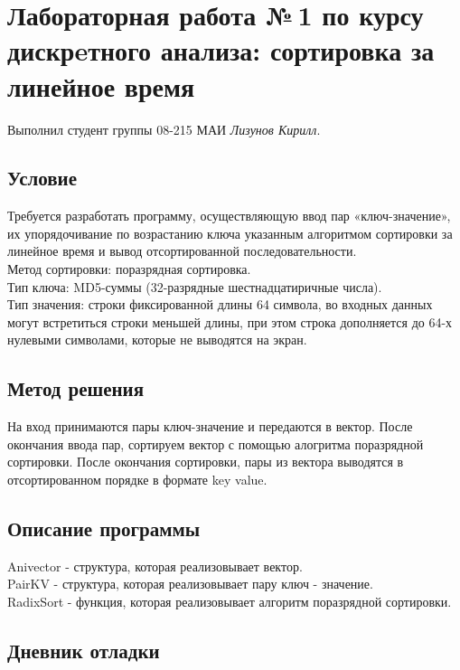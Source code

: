 \documentclass[12pt]{article}
\begin{document}
\section*{Лабораторная работа №\,1 по курсу дискрeтного анализа: сортировка за линейное время}

Выполнил студент группы 08-215 МАИ \textit{Лизунов Кирилл}.

\subsection*{Условие}


Требуется разработать программу, осуществляющую ввод пар «ключ-значение», их упорядочивание по возрастанию ключа указанным алгоритмом сортировки за линейное время и вывод отсортированной последовательности.\\
Метод сортировки: поразрядная сортировка.\\
Тип ключа: MD5-суммы (32-разрядные шестнадцатиричные числа).\\
Тип значения: строки фиксированной длины 64 символа, во входных данных могут встретиться строки меньшей длины, при этом строка дополняется до 64-х нулевыми символами, которые не выводятся на экран.


\subsection*{Метод решения}

На вход принимаются пары ключ-значение и передаются в вектор. После окончания ввода пар, сортируем вектор с помощью алогритма поразрядной сортировки. После окончания сортировки, пары из вектора выводятся в отсортированном порядке в формате key  value.

\subsection*{Описание программы}

Anivector - структура, которая реализовывает вектор.\\
PairKV - структура, которая реализовывает пару ключ - значение.\\
RadixSort - функция, которая реализовывает алгоритм поразрядной сортировки.

\subsection*{Дневник отладки}
\end{document}
